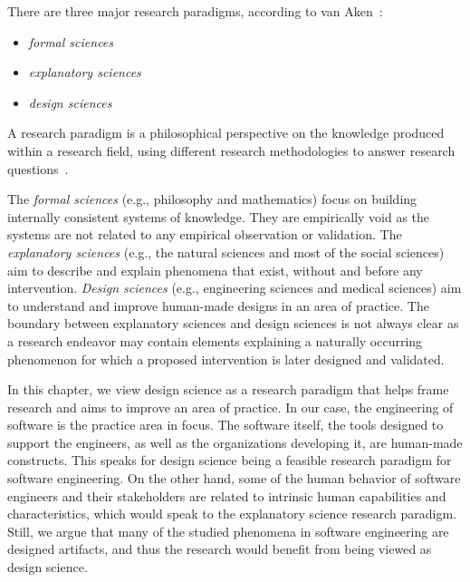 \documentclass[graybox]{svmult}
\newcommand{\peggy}[1]{\textcolor{blue}{{\it [Peggy says: #1]}}}
\newcommand{\per}[1]{\textcolor{cyan}{{\it [Per says: #1]}}}
\newcommand{\peggy}[1]{}
\newcommand{\per}[1]{}
\begin{document}
There are three major research paradigms, according to van Aken~\cite{van_aken_management_2004}:
\begin{itemize}
\item \emph{formal sciences} %
\item \emph{explanatory sciences} %
\item \emph{design sciences}%
\end{itemize}

A research paradigm is a philosophical perspective on the knowledge produced within a research field, using different research methodologies to answer research questions~\cite{van_aken_management_2004}. %

The \emph{formal sciences} (e.g., philosophy and mathematics) focus on building internally consistent systems of knowledge. They are empirically void as the systems are not related to any empirical observation or validation. The \emph{explanatory sciences} (e.g., the natural sciences and most of the social sciences) aim to describe and explain phenomena that exist, without and before any intervention. \emph{Design sciences} (e.g., engineering sciences and medical sciences) aim to understand and improve human-made designs in an area of practice. The boundary between explanatory sciences and design sciences is not always clear as a research endeavor may contain elements explaining a naturally occurring phenomenon for which a proposed intervention is later designed and validated. 

In this chapter, we view design science as a research paradigm that helps frame research and aims to improve an area of practice. In our case, the engineering of software is the practice area in focus. The software itself, the tools designed to support the engineers, as well as the organizations developing it, are human-made constructs. This speaks for design science being a feasible research paradigm for software engineering. On the other hand, some of the human behavior of software engineers and their stakeholders are related to intrinsic human capabilities and characteristics, which would speak to the explanatory science research paradigm. Still, we argue that many of the studied phenomena in software engineering are designed artifacts, and thus the research would benefit from being viewed as design science.
\end{document}
